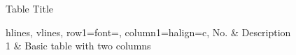 \begin{table}[!ht]
    \centering
    \small
    \caption{Table Title}
    \label{tbl:table-label}
    \begin{tblr}{%
        hlines,%
        vlines,%
        row{1}={font=\bfseries},%
        column{1}={halign=c},%
    }%
        No. & Description                        \\
        1   & Basic table with two columns       \\
    \end{tblr}
\end{table}
